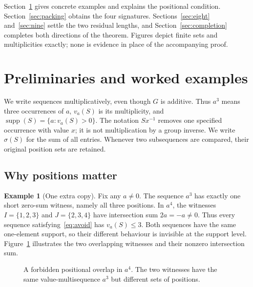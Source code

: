 \documentclass[11pt]{article}
\theoremstyle{definition}
\newtheorem{example}[theorem]{Example}
\theoremstyle{remark}
\newcommand{\supp}{\operatorname{supp}}
\newcommand{\sig}{\sigma}
\begin{document}
Section~\ref{sec:examples} gives concrete examples and explains the positional
condition. Section~\ref{sec:packing} obtains the four signatures.
Sections~\ref{sec:eight} and~\ref{sec:nine} settle the two residual lengths,
and Section~\ref{sec:completion} completes both directions of the theorem.
Figures depict finite sets and multiplicities exactly; none is evidence in
place of the accompanying proof.

\section{Preliminaries and worked examples}\label{sec:examples}
We write sequences multiplicatively, even though $G$ is additive. Thus
$a^3$ means three occurrences of $a$, $v_a(S)$ is its multiplicity, and
$\supp(S)=\{a:v_a(S)>0\}$. The notation $Sx^{-1}$ removes one specified
occurrence with value $x$; it is not multiplication by a group inverse.
We write $\sig(S)$ for the sum of all entries. Whenever two subsequences
are compared, their original position sets are retained.

\subsection{Why positions matter}
\begin{example}[One extra copy]\label{ex:four}
Fix any $a\neq0$. The sequence $a^3$ has exactly one short zero-sum
witness, namely all three positions. In $a^4$, the witnesses
$I=\{1,2,3\}$ and $J=\{2,3,4\}$ have intersection sum $2a=-a\neq0$.
Thus every sequence satisfying~\eqref{eq:avoid} has $v_a(S)\leq3$.
Both sequences have the same one-element support, so their different
behaviour is invisible at the support level.
Figure~\ref{fig:overlap} illustrates the two overlapping witnesses
and their nonzero intersection sum.
\end{example}

\begin{figure}[htbp]
\centering
{}
\caption{A forbidden positional overlap in $a^4$. The two witnesses have
the same value-multisequence $a^3$ but different sets of positions.}
\label{fig:overlap}
\end{figure}
\end{document}

